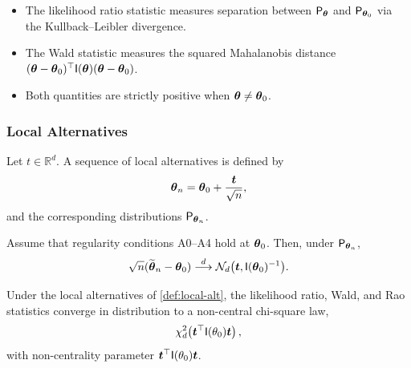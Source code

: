 \begin{ex}\label{ex:geometric}
    \leavevmode
\begin{itemize}[]
\item The likelihood ratio statistic measures separation between \(\mathsf{P}_{\boldsymbol{\theta}}\) and \(\mathsf{P}_{\boldsymbol{\theta}_0}\)
via the Kullback--Leibler divergence.
\item The Wald statistic measures the squared Mahalanobis distance
\((\boldsymbol{\theta} - \boldsymbol{\theta}_0)^{\top} \mathsf{I}(\boldsymbol{\theta}) (\boldsymbol{\theta} - \boldsymbol{\theta}_0)\).
\item Both quantities are strictly positive when \(\boldsymbol{\theta} \neq \boldsymbol{\theta}_0\).
\end{itemize}
\end{ex}

\subsubsection{Local Alternatives}

\begin{definition}\label{def:local-alt}
Let \(t \in \mathbb{R}^d\).
A sequence of local alternatives is defined by
\[
\boldsymbol{\theta}_n = \boldsymbol{\theta}_0 + \frac{\boldsymbol{t}}{\sqrt{n}},
\]
and the corresponding distributions
\(\mathsf{P}_{\boldsymbol{\theta}_n}\).
\end{definition}


\begin{theo}\label{thm:mle-local}
Assume that regularity conditions A0--A4 hold at \(\boldsymbol{\theta}_0\).
Then, under \(\mathsf{P}_{\boldsymbol{\theta}_n}\),
\begin{equation*}\label{eq:mle-local}
\sqrt{n}(\widetilde{\boldsymbol{\theta}}_n - \boldsymbol{\theta}_0)
\stackrel{d}{\longrightarrow}
\mathcal{N}_d\big(
\boldsymbol{t}, \mathsf{I}(\boldsymbol{\theta}_0)^{-1}
\big).
\end{equation*}
\end{theo}

\begin{theo}\label{thm:noncentral}
Under the local alternatives of \autoref{def:local-alt},
the likelihood ratio, Wald, and Rao statistics converge in distribution to
a non-central chi-square law,
\begin{equation}\label{eq:noncentral-chi}
\chi^2_d\!\left(
\boldsymbol{t}^{\top} \mathsf{I}(\theta_0) \boldsymbol{t}
\right),
\end{equation}
with non-centrality parameter
\(\boldsymbol{t}^{\top} \mathsf{I}(\theta_0) \boldsymbol{t}\).
\end{theo}

